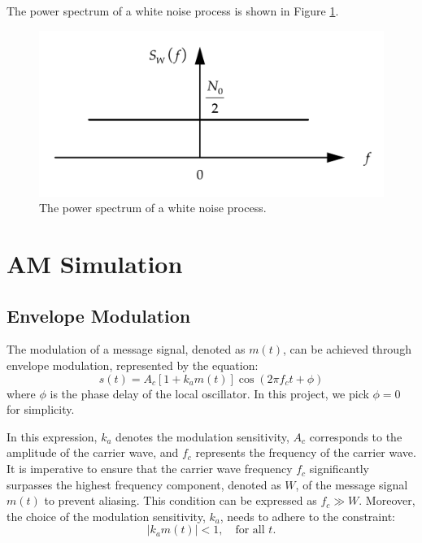 \documentclass[../ECE459FinalProjectReport.tex]{subfiles}
\begin{document}
The power spectrum of a white noise process is shown in Figure \ref{fig:white-noise-spectrum}.
\begin{figure}[htb]
    \centering
    \includegraphics[scale=0.4]{plots/white-noise-power-spectrum.pdf}
    \caption{The power spectrum of a white noise process.}
    \label{fig:white-noise-spectrum}
\end{figure}


\section{AM Simulation}
\subsection{Envelope Modulation}

The modulation of a message signal, denoted as $m(t)$, can be achieved through envelope modulation, represented by the equation:
\begin{equation}
    s(t) = A_c [1 + k_a m(t)] \cos (2\pi f_c t + \phi)
\end{equation}
where $\phi$ is the phase delay of the local oscillator. In this project, we pick $\phi = 0$ for simplicity.

In this expression, $k_a$ denotes the modulation sensitivity, $A_c$ corresponds to the amplitude of the carrier wave, and $f_c$ represents the frequency of the carrier wave. It is imperative to ensure that the carrier wave frequency $f_c$ significantly surpasses the highest frequency component, denoted as $W$, of the message signal $m(t)$ to prevent aliasing. This condition can be expressed as $f_c \gg W$. Moreover, the choice of the modulation sensitivity, $k_a$, needs to adhere to the constraint:
\begin{equation}
    \left| k_a m(t) \right| < 1, \quad \text{for all }t.
\end{equation}
\end{document}
